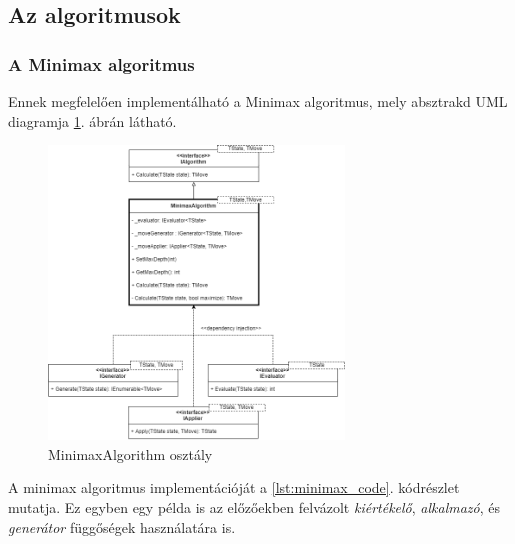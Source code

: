 \documentclass[twoside, a4paper, 12pt]{article}
\begin{document}
\subsection{Az algoritmusok}

\subsubsection{A Minimax algoritmus}
Ennek megfelelően implementálható a Minimax algoritmus, mely absztrakd UML diagramja \ref{fig:minimaxAbstractDiagram}. ábrán látható.

\begin{figure}[htbp]
	\centering
	\includegraphics[width=0.7\textwidth]{img/minimaxAbstractDiagram.png}
	\caption{MinimaxAlgorithm osztály}
	\label{fig:minimaxAbstractDiagram}
\end{figure}

A minimax algoritmus implementációját a \ref{lst:minimax_code}. kódrészlet mutatja. Ez egyben egy példa is az előzőekben felvázolt \textit{kiértékelő}, \textit{alkalmazó}, és \textit{generátor} függőségek használatára is.
\end{document}
